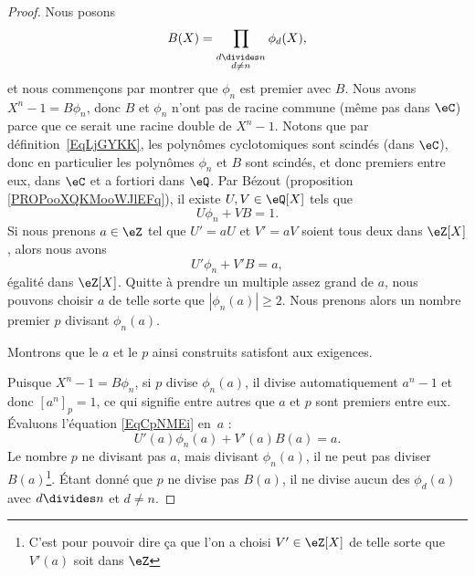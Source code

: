 \begin{proof}
	Nous posons
	\begin{equation}
		B(X)=\prod_{_{\substack{d\divides n\\d\neq n}}}\phi_d(X),
	\end{equation}
	et nous commençons par montrer que \( \phi_n\) est premier avec \( B\). Nous avons \( X^n-1=B\phi_n\), donc \( B\) et \( \phi_n\) n'ont pas de racine commune (même pas dans \( \eC\)) parce que ce serait une racine double de \( X^n-1\). Notons que par définition~\ref{EqLjGYKK}, les polynômes cyclotomiques sont scindés (dans \( \eC\)), donc en particulier les polynômes \( \phi_n\) et \( B\) sont scindés, et donc premiers entre eux, dans \( \eC\) et a fortiori dans \( \eQ\). Par Bézout (proposition \ref{PROPooXQKMooWJlEFq}), il existe \( U,V\in\eQ[X]\) tels que
	\begin{equation}
		U\phi_n+VB=1.
	\end{equation}
	Si nous prenons \( a\in \eZ\) tel que \( U'=aU\) et \( V'=aV\) soient tous deux dans \( \eZ[X]\), alors nous avons
	\begin{equation}    \label{EqCpNMEi}
		U'\phi_n+V'B=a,
	\end{equation}
	égalité dans \( \eZ[X]\). Quitte à prendre un multiple assez grand de \( a\), nous pouvons choisir \( a\) de telle sorte que \( | \phi_n(a) |\geq 2\). Nous prenons alors un nombre premier \( p\) divisant \( \phi_n(a)\).

	Montrons que le \( a\) et le \( p\) ainsi construits satisfont aux exigences.

	Puisque \( X^n-1=B\phi_n\), si \( p\) divise \( \phi_n(a)\), il divise automatiquement \( a^n-1\) et donc \( [a^n]_p=1\), ce qui signifie entre autres que \( a\) et \( p\) sont premiers entre eux. Évaluons l'équation \eqref{EqCpNMEi} en~\( a\) :
	\begin{equation}
		U'(a)\phi_n(a)+V'(a)B(a)=a.
	\end{equation}
	Le nombre \( p\) ne divisant pas \( a\), mais divisant \( \phi_n(a)\), il ne peut pas diviser \( B(a)\)\footnote{C'est pour pouvoir dire ça que l'on a choisi \( V'\in \eZ[X]\) de telle sorte que \( V'(a)\) soit dans \( \eZ\)}. Étant donné que \( p\) ne divise pas \( B(a)\), il ne divise aucun des \( \phi_d(a)\) avec \( d\divides n\) et \( d\neq n\).


\end{proof}
